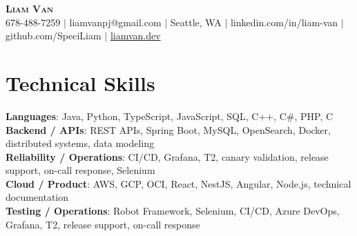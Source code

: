 \documentclass[letterpaper,11pt]{article}
\begin{document}

%
\begin{center}
    \textbf{\Huge \scshape Liam Van} \\ \vspace{1pt}
    \small 678-488-7259 $|$ liamvanpj@gmail.com $|$ Seattle, WA $|$
    linkedin.com/in/liam-van $|$ github.com/SpeciLiam $|$ \href{https://liamvan.dev}{liamvan.dev}

\end{center}

\section{Technical Skills}
 \begin{itemize}[leftmargin=0.15in, label={}]
    \small{\item{
     \textbf{Languages}{: Java, Python, TypeScript, JavaScript, SQL, C++, C\#, PHP, C} \\
     \textbf{Backend / APIs}{: REST APIs, Spring Boot, MySQL, OpenSearch, Docker, distributed systems, data modeling} \\
     \textbf{Reliability / Operations}{: CI/CD, Grafana, T2, canary validation, release support, on-call response, Selenium} \\
     \textbf{Cloud / Product}{: AWS, GCP, OCI, React, NestJS, Angular, Node.js, technical documentation} \\
     \textbf{Testing / Operations}{: Robot Framework, Selenium, CI/CD, Azure DevOps, Grafana, T2, release support, on-call response} \\
    }}
 \end{itemize}
%
\end{document}
